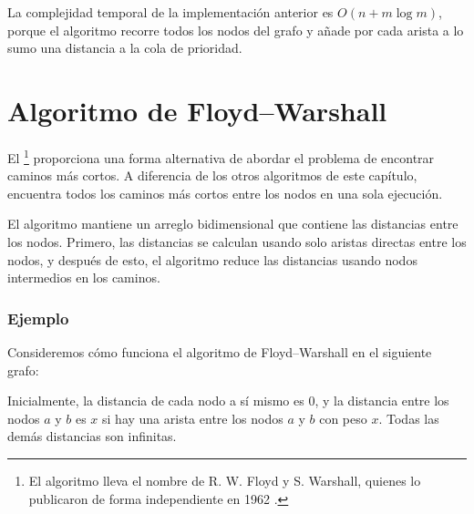 La complejidad temporal de la implementación anterior es
$O(n+m \log m)$, porque el algoritmo recorre
todos los nodos del grafo y añade por cada arista
a lo sumo una distancia a la cola de prioridad.

\section{Algoritmo de Floyd–Warshall}


El \footnote{El algoritmo
lleva el nombre de R. W. Floyd y S. Warshall,
quienes lo publicaron de forma independiente en 1962 \cite{flo62,war62}.}
proporciona una forma alternativa de abordar el problema
de encontrar caminos más cortos.
A diferencia de los otros algoritmos de este capítulo,
encuentra todos los caminos más cortos entre los nodos
en una sola ejecución.

El algoritmo mantiene un arreglo bidimensional
que contiene las distancias entre los nodos.
Primero, las distancias se calculan usando solo
aristas directas entre los nodos,
y después de esto, el algoritmo reduce las distancias
usando nodos intermedios en los caminos.

\subsubsection{Ejemplo}

Consideremos cómo funciona el algoritmo de Floyd–Warshall
en el siguiente grafo:

\begin{center}
\end{center}

Inicialmente, la distancia de cada nodo a sí mismo es $0$,
y la distancia entre los nodos $a$ y $b$ es $x$
si hay una arista entre los nodos $a$ y $b$ con peso $x$.
Todas las demás distancias son infinitas.

